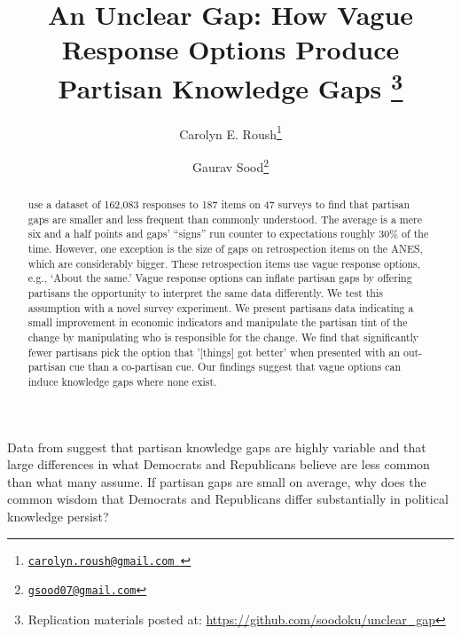 \documentclass[12pt, letterpaper]{article}
\title{An Unclear Gap: How Vague Response Options Produce Partisan Knowledge Gaps \thanks{Replication materials posted at: \url{ https://github.com/soodoku/unclear_gap}}}
\author{Carolyn E. Roush\thanks{\href{mailto:carolyn.roush@gmail.com}{\texttt{carolyn.roush@gmail.com }}} \and Gaurav Sood\thanks{\href{mailto:gsood07@gmail.com}{\texttt{gsood07@gmail.com}}}}
\begin{document}
\maketitle
\thispagestyle{empty}

\begin{abstract}

\noindent \citet{roush_2021} use a dataset of 162,083 responses to 187 items on 47 surveys to find that partisan gaps are smaller and less frequent than commonly understood. The average is a mere six and a half points and gaps' ``signs'' run counter to expectations roughly 30\% of the time. However, one exception is the size of gaps on retrospection items on the ANES, which are considerably bigger. These retrospection items use vague response options, e.g., `About the same.' Vague response options can inflate partisan gaps by offering partisans the opportunity to interpret the same data differently. We test this assumption with a novel survey experiment. We present partisans data indicating a small improvement in economic indicators and manipulate the partisan tint of the change by manipulating who is responsible for the change. We find that significantly fewer partisans pick the option that '[things] got better' when presented with an out-partisan cue than a co-partisan cue. Our findings suggest that vague options can induce knowledge gaps where none exist.
\end{abstract}

\vspace{.2in}


\newpage

\doublespacing
Data from \citet{roush_2021} suggest that partisan knowledge gaps are highly variable and that large differences in what Democrats and Republicans believe are less common than what many assume. If partisan gaps are small on average, why does the common wisdom that Democrats and Republicans differ substantially in political knowledge persist? 
\end{document}
